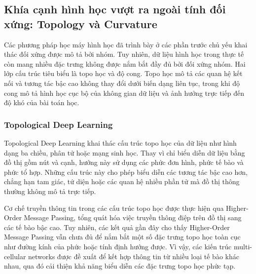 \subsection{Khía cạnh hình học vượt ra ngoài tính đối xứng: Topology và Curvature}
\label{subsec:beyond-symmetry}

Các phương pháp học máy hình học đã trình bày ở các phần trước chủ yếu khai thác đối xứng được mô tả bởi nhóm. Tuy nhiên, dữ liệu hình học trong thực tế còn mang nhiều đặc trưng không được nắm bắt đầy đủ bởi đối xứng nhóm. Hai lớp cấu trúc tiêu biểu là topo học và độ cong. Topo học mô tả các quan hệ kết nối và tương tác bậc cao không thay đổi dưới biến dạng liên tục, trong khi độ cong mô tả hình học cục bộ của không gian dữ liệu và ảnh hưởng trực tiếp đến độ khó của bài toán học.

\subsubsection{Topological Deep Learning}

Topological Deep Learning khai thác cấu trúc topo học của dữ liệu như hình dạng ba chiều, phân tử hoặc mạng sinh học. Thay vì chỉ biểu diễn dữ liệu bằng đồ thị gồm nút và cạnh, hướng này sử dụng các phức đơn hình, phức tế bào và phức tổ hợp. Những cấu trúc này cho phép biểu diễn các tương tác bậc cao hơn, chẳng hạn tam giác, tứ diện hoặc các quan hệ nhiều phần tử mà đồ thị thông thường không mô tả trực tiếp.

Cơ chế truyền thông tin trong các cấu trúc topo học được thực hiện qua Higher-Order Message Passing, tổng quát hóa việc truyền thông điệp trên đồ thị sang các tế bào bậc cao. Tuy nhiên, các kết quả gần đây cho thấy Higher-Order Message Passing vẫn chưa đủ để nắm bắt một số đặc trưng topo học toàn cục như đường kính của phức hoặc tính định hướng được. Vì vậy, các kiến trúc multi-cellular networks được đề xuất để kết hợp thông tin từ nhiều loại tế bào khác nhau, qua đó cải thiện khả năng biểu diễn các đặc trưng topo học phức tạp.

